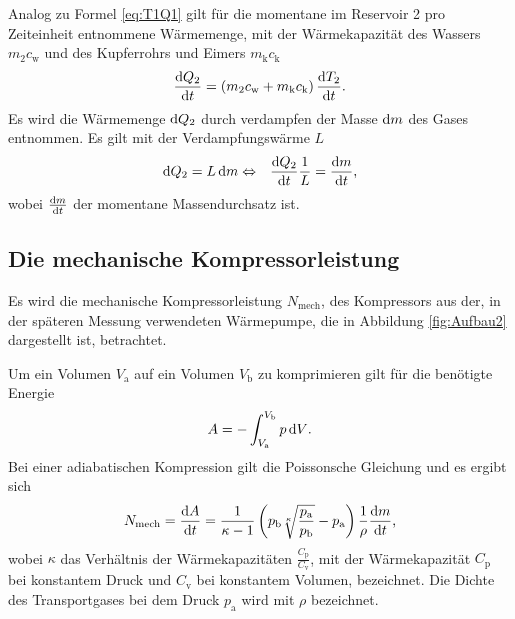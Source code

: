 Analog zu Formel \eqref{eq:T1Q1} gilt für die momentane im Reservoir 2 pro Zeiteinheit entnommene Wärmemenge, mit der Wärmekapazität des Wassers $m_2c_\text{w}$ und des Kupferrohrs und Eimers $m_\text{k}c_\text{k}$
\begin{equation}
\frac{\mathop{}\!\mathrm{d} Q_2}{\mathop{}\!\mathrm{d} t} = \left( m_2c_\text{w} + m_\text{k}c_\text{k}\right) \frac{\mathop{}\!\mathrm{d} T_2}{\mathop{}\!\mathrm{d} t}\label{eq:T2Q2}\text{.}
\end{equation}
Es wird die Wärmemenge $\mathop{}\!\mathrm{d} Q_2$ durch verdampfen der Masse $\mathop{}\!\mathrm{d} m$ des Gases entnommen.
Es gilt mit der Verdampfungswärme $L$
\begin{equation}
\begin{aligned}
\mathop{}\!\mathrm{d} Q_2 = L \mathop{}\!\mathrm{d} m & \Leftrightarrow & \frac{\mathop{}\!\mathrm{d} Q_2}{\mathop{}\!\mathrm{d} t} \frac{1}{L} = \frac{\mathop{}\!\mathrm{d} m}{\mathop{}\!\mathrm{d} t}\text{,}\label{eq:diffmdifft}
\end{aligned}
\end{equation}
wobei $\frac{\mathop{}\!\mathrm{d} m}{\mathop{}\!\mathrm{d} t}$ der momentane Massendurchsatz ist.

\subsection{Die mechanische Kompressorleistung}
Es wird die mechanische Kompressorleistung $N_\text{mech}$, des Kompressors aus der, in der späteren Messung verwendeten Wärmepumpe, die in Abbildung \ref{fig:Aufbau2} dargestellt ist, betrachtet.

Um ein Volumen $V_\text{a}$ auf ein Volumen $V_\text{b}$ zu komprimieren gilt für die benötigte Energie
\begin{eqnarray}
 A= -\int_{V_\text{a}}^{V_\text{b}} p \mathop{}\!\mathrm{d} V\text{.}
\end{eqnarray}
Bei einer adiabatischen Kompression gilt die Poissonsche Gleichung und es ergibt sich
\begin{equation}
N_\text{mech}=\frac{\mathop{}\!\mathrm{d} A}{\mathop{}\!\mathrm{d} t}= \frac{1}{\kappa -1}\left(p_\text{b} \sqrt[\kappa]{\frac{p_\text{a}}{p_\text{b}}} -p_\text{a}\right)\frac{1}{\rho} \frac{\mathop{}\!\mathrm{d} m}{\mathop{}\!\mathrm{d} t}\text{,}\label{eq:Nmech}
\end{equation}
wobei $\kappa$ das Verhältnis der Wärmekapazitäten $\frac{C_\text{p}}{C_\text{v}}$, mit der Wärmekapazität $C_\text{p}$ bei konstantem Druck und ${C_\text{v}}$ bei konstantem Volumen, bezeichnet.
Die Dichte des Transportgases bei dem Druck $p_\text{a}$ wird mit $\rho$ bezeichnet.
